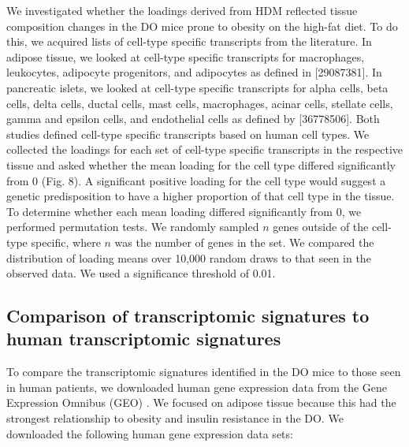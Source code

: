 \documentclass[
]{article}
\begin{document}
We investigated whether the loadings derived from HDM reflected tissue
composition changes in the DO mice prone to obesity on the high-fat
diet. To do this, we acquired lists of cell-type specific transcripts
from the literature. In adipose tissue, we looked at cell-type specific
transcripts for macrophages, leukocytes, adipocyte progenitors, and
adipocytes as defined in {[}29087381{]}. In pancreatic islets, we looked
at cell-type specific transcripts for alpha cells, beta cells, delta
cells, ductal cells, mast cells, macrophages, acinar cells, stellate
cells, gamma and epsilon cells, and endothelial cells as defined by
{[}36778506{]}. Both studies defined cell-type specific transcripts
based on human cell types. We collected the loadings for each set of
cell-type specific transcripts in the respective tissue and asked
whether the mean loading for the cell type differed significantly from 0
(Fig. 8). A significant positive loading for the cell type would suggest
a genetic predisposition to have a higher proportion of that cell type
in the tissue. To determine whether each mean loading differed
significantly from 0, we performed permutation tests. We randomly
sampled \(n\) genes outside of the cell-type specific, where \(n\) was
the number of genes in the set. We compared the distribution of loading
means over 10,000 random draws to that seen in the observed data. We
used a significance threshold of 0.01.

\subsection{Comparison of transcriptomic signatures to human
transcriptomic
signatures}\label{comparison-of-transcriptomic-signatures-to-human-transcriptomic-signatures}

To compare the transcriptomic signatures identified in the DO mice to
those seen in human patients, we downloaded human gene expression data
from the Gene Expression Omnibus (GEO)
\cite{pmid37933855, pmid11752295}. We focused on adipose tissue because
this had the strongest relationship to obesity and insulin resistance in
the DO. We downloaded the following human gene expression data sets:
\end{document}

